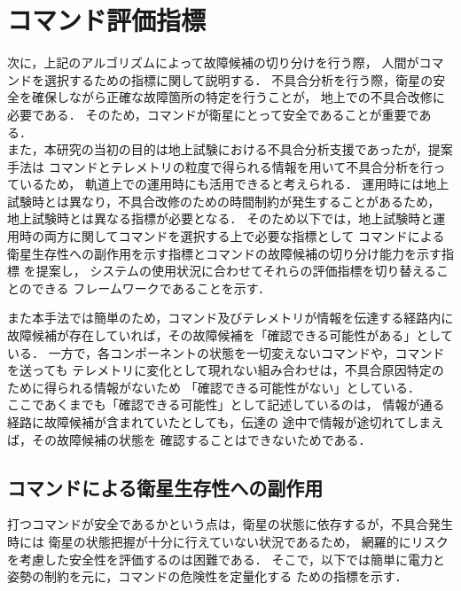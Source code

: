 \documentclass[11pt]{jsreport}
\begin{document}
\section{コマンド評価指標}
次に，上記のアルゴリズムによって故障候補の切り分けを行う際，
人間がコマンドを選択するための指標に関して説明する．
不具合分析を行う際，衛星の安全を確保しながら正確な故障箇所の特定を行うことが，
地上での不具合改修に必要である．
そのため，コマンドが衛星にとって安全であることが重要である．\\
また，本研究の当初の目的は地上試験における不具合分析支援であったが，提案手法は
コマンドとテレメトリの粒度で得られる情報を用いて不具合分析を行っているため，
軌道上での運用時にも活用できると考えられる．
運用時には地上試験時とは異なり，不具合改修のための時間制約が発生することがあるため，
地上試験時とは異なる指標が必要となる．
そのため以下では，地上試験時と運用時の両方に関してコマンドを選択する上で必要な指標として
コマンドによる衛星生存性への副作用を示す指標とコマンドの故障候補の切り分け能力を示す指標
を提案し，
システムの使用状況に合わせてそれらの評価指標を切り替えることのできる
フレームワークであることを示す．

また本手法では簡単のため，コマンド及びテレメトリが情報を伝達する経路内に
故障候補が存在していれば，その故障候補を「確認できる可能性がある」としている．
一方で，各コンポーネントの状態を一切変えないコマンドや，コマンドを送っても
テレメトリに変化として現れない組み合わせは，不具合原因特定のために得られる情報がないため
「確認できる可能性がない」としている．\\
ここであくまでも「確認できる可能性」として記述しているのは，
情報が通る経路に故障候補が含まれていたとしても，伝達の
途中で情報が途切れてしまえば，その故障候補の状態を
確認することはできないためである．

\subsection{コマンドによる衛星生存性への副作用}
打つコマンドが安全であるかという点は，衛星の状態に依存するが，不具合発生時には
衛星の状態把握が十分に行えていない状況であるため，
網羅的にリスクを考慮した安全性を評価するのは困難である．
そこで，以下では簡単に電力と姿勢の制約を元に，コマンドの危険性を定量化する
ための指標を示す．
\end{document}
